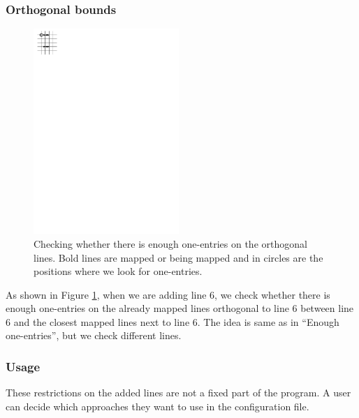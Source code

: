 \subsubsection{Orthogonal bounds}
\begin{figure}[h!]
\centering
\includegraphics[width=55mm]{../img/orthogonal.pdf}
\caption{Checking whether there is enough one-entries on the orthogonal lines. Bold lines are mapped or being mapped and in circles are the positions where we look for one-entries.}
\label{orthogonal}
\end{figure}
As shown in Figure \ref{orthogonal}, when we are adding line 6, we check whether there is enough one-entries on the already mapped lines orthogonal to line 6 between line 6 and the closest mapped lines next to line 6. The idea is same as in ``Enough one-entries'', but we check different lines.

\subsubsection{Usage}
These restrictions on the added lines are not a fixed part of the program. A user can decide which approaches they want to use in the configuration file.

